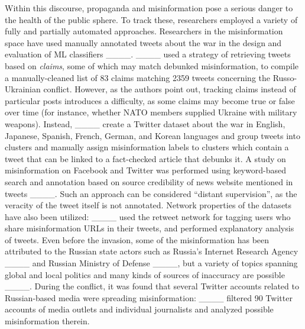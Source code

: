 
Within this discourse, propaganda and misinformation pose a serious danger to the health of the public sphere. 
To track these, researchers employed a variety of fully and partially automated approaches. 
Researchers in the misinformation space have used manually annotated tweets about the war in the design and evaluation of ML classifiers ____.
____ used a strategy of retrieving tweets based on \emph{claims}, some of which may match debunked misinformation, to compile a manually-cleaned list of \num{83} claims matching \num{2359} tweets concerning the Russo-Ukrainian conflict.
However, as the authors point out, tracking claims instead of particular posts introduces a difficulty, as some claims may become true or false over time (for instance, whether NATO members supplied Ukraine with military weapons). 
Instead, ____ create a Twitter dataset about the war in English, Japanese, Spanish, French, German, and Korean languages %
and group tweets into clusters %
and manually assign misinformation labels to clusters which contain a tweet that can be linked to a fact-checked article that debunks it. 
A study on misinformation on Facebook and Twitter was performed using keyword-based search and annotation based on source credibility of news website mentioned in tweets ____. 
Such an approach can be considered ``distant supervision'', as the veracity of the tweet itself is not annotated.
Network properties of the datasets have also been utilized: ____ used the retweet network for tagging users who share misinformation URLs in their tweets, and performed explanatory analysis of tweets. 
Even before the invasion, some of the misinformation has been attributed to the Russian state actors such as Russia's Internet Research Agency ____ and Russian Ministry of Defense ____, but a variety of topics spanning global and local politics and many kinds of sources of inaccuracy are possible ____. 
During the conflict, it was found that several Twitter accounts related to Russian-based media were spreading misinformation: ____ filtered 90 Twitter accounts of media outlets and individual journalists and analyzed possible misinformation therein. 



